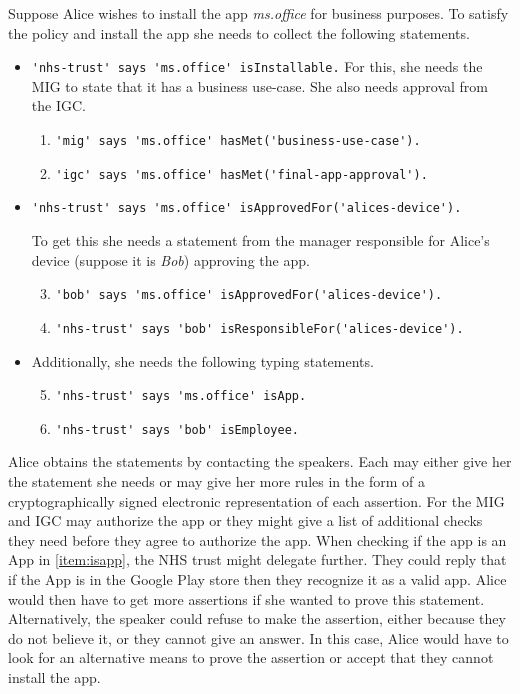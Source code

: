\documentclass[thesis.tex]{subfiles}
\begin{document}
Suppose Alice wishes to install the app \emph{\ttfamily ms.office} for
business purposes.  To satisfy the policy and install the app she
needs to collect the following statements.

\medskip
\begin{itemize}
  \item \lstinline!'nhs-trust' says 'ms.office' isInstallable.!
    For this, she needs the \ac{MIG} to state that it has a business use-case.
    She also needs approval from the \ac{IGC}.
    \begin{enumerate}\setcounter{enumi}{0}
      \item \lstinline!'mig' says 'ms.office' hasMet('business-use-case').!
      \item \lstinline!'igc' says 'ms.office' hasMet('final-app-approval').!
    \end{enumerate}
  \item \lstinline!'nhs-trust' says 'ms.office' isApprovedFor('alices-device').!

    To get this she needs a statement from the manager responsible for Alice's device (suppose it is \emph{Bob}) approving the app.
    \begin{enumerate}\setcounter{enumi}{2}
      \item \lstinline!'bob' says 'ms.office' isApprovedFor('alices-device').!
      \item \lstinline!'nhs-trust' says 'bob' isResponsibleFor('alices-device').!
    \end{enumerate}
  \item Additionally, she needs the following typing statements.
    \begin{enumerate}\setcounter{enumi}{4}
      \item \lstinline!'nhs-trust' says 'ms.office' isApp.! \label{item:isapp}
      \item \lstinline!'nhs-trust' says 'bob' isEmployee.!
    \end{enumerate}
\end{itemize}
%
Alice obtains the statements by contacting the speakers. Each may either give
her the statement she needs or may give her more rules in the form of a
cryptographically signed electronic representation of each assertion. For
the \ac{MIG} and \ac{IGC} may authorize the app or they might give a
list of additional checks they need before they agree to authorize the app. When
checking if the app is an App in \autoref{item:isapp}, the NHS trust might
delegate further. They could reply that if the App is in the Google Play store
then they recognize it as a valid app. Alice would then have to get more
assertions if she wanted to prove this statement. Alternatively, the speaker
could refuse to make the assertion, either because they do not believe it, or
they cannot give an answer. In this case, Alice would have to look for an
alternative means to prove the assertion or accept that they cannot install the
app.
\end{document}
